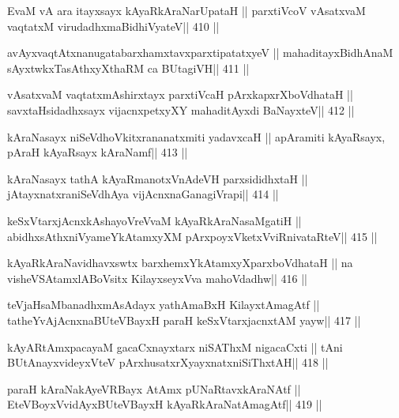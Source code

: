 \begin{shl}
EvaM vA ara itayxsayx kAyaRkAraNarUpataH ||
parxtiVcoV vAsatxvaM vaqtatxM virudadhxmaBidhiVyateV\hfill || 410 ||
\end{shl}

\begin{shl}
avAyxvaqtAtxnanugatabarxhamxtavxparxtipatatxyeV ||
mahaditayxBidhAnaM sAyxtwkxTasAthxyXthaRM ca BUtagiVH\hfill || 411 ||
\end{shl}

\begin{shl}
vAsatxvaM vaqtatxmAshirxtayx parxtiVcaH pArxkapxrXboVdhataH ||
savxtaHsidadhxsayx vijacnxpetxyXY mahaditAyxdi BaNayxteV\hfill || 412 ||
\end{shl}

\begin{shl}
kAraNasayx niSeVdhoVkitxrananatxmiti yadavxcaH ||
apAramiti kAyaRsayx, pAraH kAyaRsayx kAraNamf\hfill || 413 ||
\end{shl}

\begin{shl}
kAraNasayx tathA kAyaRmanotxV\s nAdeVH parxsididhxtaH ||
jAtayxnatxraniSeVdhAya vijAcnxnaGanagiVrapi\hfill || 414 ||
\end{shl}

\begin{shl}
keSxVtarxjAcnxkAshayoVreVvaM kAyaRkAraNasaMgatiH ||
abidhxsAthxniVyameYkAtamxyXM pArxpoyxVketxVviRnivataRteV\hfill || 415 ||
\end{shl}

\begin{shl}
kAyaRkAraNavidhavxswtx barxhemxYkAtamxyXparxboVdhataH ||
na visheVSAtamxlABoV\s sitx KilayxseyxVva mahoVdadhw\hfill || 416 ||
\end{shl}

\begin{shl}
teVjaHsaMbanadhxmAsAdayx yathA\s maBxH KilayxtAmagAtf ||
tatheYvAjAcnxnaBUteVBayxH paraH keSxVtarxjacnxtAM yayw\hfill || 417 ||
\end{shl}

\begin{shl}
kAyARtAmx\s pacayaM gacaCxnayxtarx niSAThxM nigacaCxti ||
tAni BUtAnayxvideyxVteV pArxhusatxrXyayxnatxniSiThxtAH\hfill || 418 ||
\end{shl}

\begin{shl}
paraH kAraNakAyeVRBayx AtAmx pUNaRtavxkAraNAtf ||
EteVBoyxV\s vidAyxBUteVBayxH kAyaRkAraNatAmagAtf\hfill || 419 ||
\end{shl}

